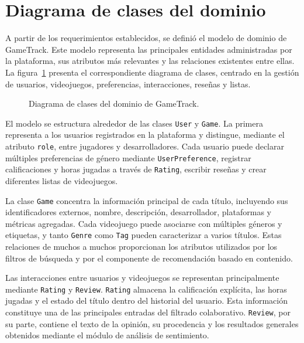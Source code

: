 \section{Diagrama de clases del dominio}\label{sec:diagrama_clases}

A partir de los requerimientos establecidos, se definió el modelo de dominio de GameTrack. Este modelo representa las principales entidades administradas por la plataforma, sus atributos más relevantes y las relaciones existentes entre ellas. La figura~\ref{fig:diagrama_clases} presenta el correspondiente diagrama de clases, centrado en la gestión de usuarios, videojuegos, preferencias, interacciones, reseñas y listas.

\begin{landscape}
\begin{figure}[H]
	\centering
	\caption{Diagrama de clases del dominio de GameTrack.}
	\label{fig:diagrama_clases}
\end{figure}
\end{landscape}

El modelo se estructura alrededor de las clases \texttt{User} y \texttt{Game}. La primera representa a los usuarios registrados en la plataforma y distingue, mediante el atributo \texttt{role}, entre jugadores y desarrolladores. Cada usuario puede declarar múltiples preferencias de género mediante \texttt{UserPreference}, registrar calificaciones y horas jugadas a través de \texttt{Rating}, escribir reseñas y crear diferentes listas de videojuegos.

La clase \texttt{Game} concentra la información principal de cada título, incluyendo sus identificadores externos, nombre, descripción, desarrollador, plataformas y métricas agregadas. Cada videojuego puede asociarse con múltiples géneros y etiquetas, y tanto \texttt{Genre} como \texttt{Tag} pueden caracterizar a varios títulos. Estas relaciones de muchos a muchos proporcionan los atributos utilizados por los filtros de búsqueda y por el componente de recomendación basado en contenido.

Las interacciones entre usuarios y videojuegos se representan principalmente mediante \texttt{Rating} y \texttt{Review}. \texttt{Rating} almacena la calificación explícita, las horas jugadas y el estado del título dentro del historial del usuario. Esta información constituye una de las principales entradas del filtrado colaborativo. \texttt{Review}, por su parte, contiene el texto de la opinión, su procedencia y los resultados generales obtenidos mediante el módulo de análisis de sentimiento.


